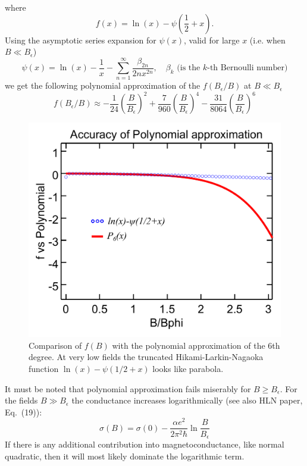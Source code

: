 \documentclass[11pt]{article} %
\begin{document}
where
\begin{equation}
	f(x) = \ln(x) - \psi\left(\frac{1}{2}+x\right).
\end{equation}
Using the asymptotic series expansion for $\psi(x)$, valid for large $x$ (i.e. when $B\ll B_\epsilon$)
\begin{equation}
	\psi(x) = \ln(x)-\frac{1}{x}-\sum\limits_{n=1}^\infty \frac{\beta_{2n}}{2n x^{2n}},\quad \beta_k \textrm{ (is the $k$-th Bernoulli number)}
\end{equation}
we get the following polynomial approximation of the $f(B_\epsilon/B)$ at $B\ll B_\epsilon$
\begin{equation}
	f(B_\epsilon/B) \approx -\frac{1}{24}\left(\frac{B}{B_\epsilon}\right)^2+\frac{7}{960}\left(\frac{B}{B_\epsilon}\right)^4-\frac{31}{8064}\left(\frac{B}{B_\epsilon}\right)^6
\end{equation}
\begin{figure}[h!]
    \centering	
	 \includegraphics[scale=0.5]{fVsPoly}
	 \caption{Comparison of $f(B)$ with the polynomial approximation of the 6th degree. At very low fields the truncated Hikami-Larkin-Nagaoka function $\ln(x)-\psi\left( 1/2+x\right)$ looks like parabola.}
    \label{fig:fVsPoly}
\end{figure}
It must be noted that polynomial approximation fails miserably for $B\ge B_\epsilon$. For the fields $B\gg B_\epsilon$ the conductance increases logarithmically (see also HLN paper, Eq.~(19)):
\begin{equation}
	\sigma(B) = \sigma(0) -\frac{\alpha e^2}{2\pi^2\hbar}\ln\frac{B}{B_\epsilon}
\end{equation}
If there is any additional contribution into magnetoconductance, like normal quadratic, then it will most likely dominate the logarithmic term.
\end{document}
